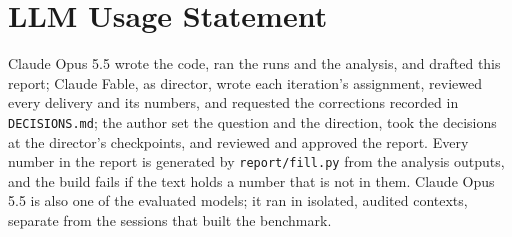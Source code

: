 \documentclass[
  10pt,
]{article}
\begin{document}
\section{LLM Usage Statement}\label{llm-usage-statement}

Claude Opus 5.5 wrote the code, ran the runs and the analysis, and
drafted this report; Claude Fable, as director, wrote each iteration's
assignment, reviewed every delivery and its numbers, and requested the
corrections recorded in \texttt{DECISIONS.md}; the author set the
question and the direction, took the decisions at the director's
checkpoints, and reviewed and approved the report. Every number in the
report is generated by \texttt{report/fill.py} from the analysis
outputs, and the build fails if the text holds a number that is not in
them. Claude Opus 5.5 is also one of the evaluated models; it ran in
isolated, audited contexts, separate from the sessions that built the
benchmark.
\end{document}
